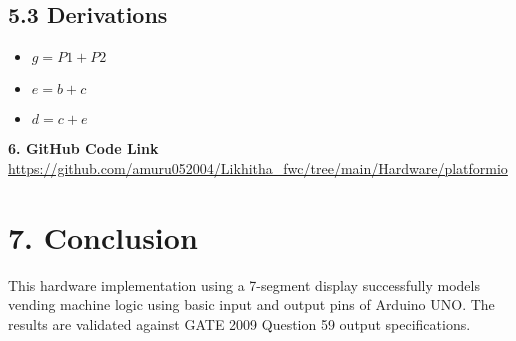 \documentclass[12pt]{article}
\begin{document}
\subsection*{5.3 Derivations}
\begin{itemize}
    \item $g = P1 + P2$
    \item $e = b + c$
    \item $d = c + e$
\end{itemize}


\vspace{1em}
\noindent\textbf{6. GitHub Code Link} \\
\url{https://github.com/amuru052004/Likhitha_fwc/tree/main/Hardware/platformio}

\vspace{1em}
\section*{7. Conclusion}
This hardware implementation using a 7-segment display successfully models vending machine logic using basic input and output pins of Arduino UNO. The results are validated against GATE 2009 Question 59 output specifications.
\end{document}
